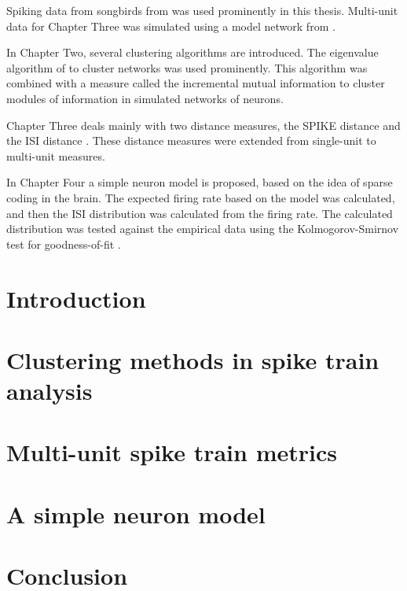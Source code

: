 \documentclass[12pt]{report}
\begin{document}
Spiking data from songbirds from \citep{NarayanEtAl2006b} was used prominently in this thesis.  Multi-unit data for Chapter Three was simulated using a model network from \citep{HoughtonSen2008a}.

In Chapter Two, several clustering algorithms are introduced.  The eigenvalue algorithm of \citep{Newman2006b} to cluster networks was used prominently. This algorithm was combined with a measure called the incremental mutual information \citep{SinghLesica2010a} to cluster modules of information in simulated networks of neurons.

Chapter Three deals mainly with two distance measures, the SPIKE distance \citep{KreuzEtAl2012a} and the ISI distance \citep{KreuzEtAl2007a}.  These distance measures were extended from single-unit to multi-unit measures.

In Chapter Four a simple neuron model is proposed, based on the idea of sparse coding in the brain.  The expected firing rate based on the model was calculated, and then the ISI distribution was calculated from the firing rate.  The calculated distribution was tested against the empirical data using the Kolmogorov-Smirnov test for goodness-of-fit \citep{Massey1951a}.

\tableofcontents


\chapter{Introduction}


\chapter{Clustering methods in spike train analysis}


\chapter{Multi-unit spike train metrics}


\chapter{A simple neuron model}


\chapter{Conclusion}



\end{document}
